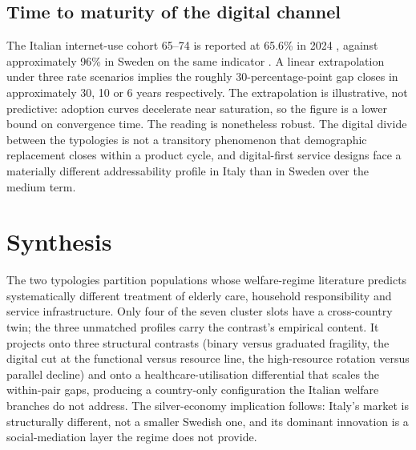 \subsection{Time to maturity of the digital channel}
\label{sec:ch6-time-to-maturity}

The Italian internet-use cohort 65--74 is reported at 65.6\% in 2024 \citep{eurostat2024}, against approximately 96\% in Sweden on the same indicator \citep{eurostat2022}. A linear extrapolation under three rate scenarios implies the roughly 30-percentage-point gap closes in approximately 30, 10 or 6 years respectively. The extrapolation is illustrative, not predictive: adoption curves decelerate near saturation, so the figure is a lower bound on convergence time. The reading is nonetheless robust. The digital divide between the typologies is not a transitory phenomenon that demographic replacement closes within a product cycle, and digital-first service designs face a materially different addressability profile in Italy than in Sweden over the medium term.

\section{Synthesis}
\label{sec:ch6-synthesis}

 The two typologies partition populations whose welfare-regime literature predicts systematically different treatment of elderly care, household responsibility and service infrastructure. Only four of the seven cluster slots have a cross-country twin; the three unmatched profiles carry the contrast's empirical content. It projects onto three structural contrasts (binary versus graduated fragility, the digital cut at the functional versus resource line, the high-resource rotation versus parallel decline) and onto a healthcare-utilisation differential that scales the within-pair gaps, producing a country-only configuration the Italian welfare branches do not address. The silver-economy implication follows: Italy's market is structurally different, not a smaller Swedish one, and its dominant innovation is a social-mediation layer the regime does not provide.
